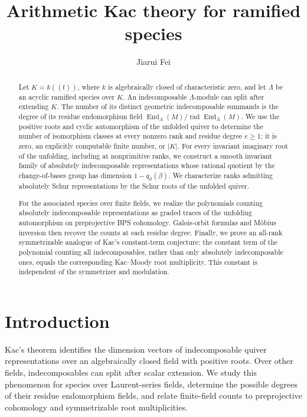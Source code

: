 \documentclass[11pt, reqno]{amsart}
\title[Arithmetic Kac theory]{Arithmetic Kac theory for ramified species}
\author{Jiarui Fei}
\date{}
\numberwithin{equation}{section}
\theoremstyle{definition}
\theoremstyle{remark}
\newcommand{\op}[1]{\operatorname{#1}}
\newcommand{\End}{\op{End}}
\newcommand{\rad}{\op{rad}}
\begin{document}
\begin{abstract}
Let $K=k((t))$, where $k$ is algebraically closed of characteristic
zero, and let $\Lambda$ be an acyclic ramified species over $K$.
An indecomposable $\Lambda$-module can split after extending $K$.
The number of its distinct geometric indecomposable summands
is the degree of its residue endomorphism field
$\End_\Lambda(M)/\rad\End_\Lambda(M)$.
We use the positive roots and cyclic automorphism of the unfolded
quiver to determine the number of isomorphism classes at every nonzero
rank and residue degree $e\ge1$: it is zero, an explicitly computable
finite number, or $|K|$.
For every invariant imaginary root of the unfolding, including
at nonprimitive ranks, we construct a smooth invariant family of
absolutely indecomposable representations whose rational quotient by
the change-of-bases group has dimension $1-q_d(\beta)$.
We characterize ranks admitting absolutely Schur representations
by the Schur roots of the unfolded quiver.

For the associated species over finite fields, we realize the polynomials
counting absolutely indecomposable representations as graded traces
of the unfolding automorphism on preprojective BPS cohomology.
Galois-orbit formulas and M\"obius inversion then recover the counts
at each residue degree. Finally, we prove an all-rank symmetrizable
analogue of Kac's constant-term conjecture: the constant term of the
polynomial counting all indecomposables, rather than only absolutely
indecomposable ones, equals the corresponding Kac--Moody root
multiplicity. This constant is independent of the symmetrizer and
modulation.
\end{abstract}
\maketitle

\begingroup\small
\tableofcontents
\endgroup
\clearpage

\section*{Introduction}

Kac's theorem identifies the dimension vectors of indecomposable quiver
representations over an algebraically closed field with positive roots.
Over other fields, indecomposables can split after scalar extension.
We study this phenomenon for species over Laurent-series fields,
determine the possible degrees of their residue endomorphism fields,
and relate finite-field counts to preprojective cohomology and
symmetrizable root multiplicities.
\end{document}
